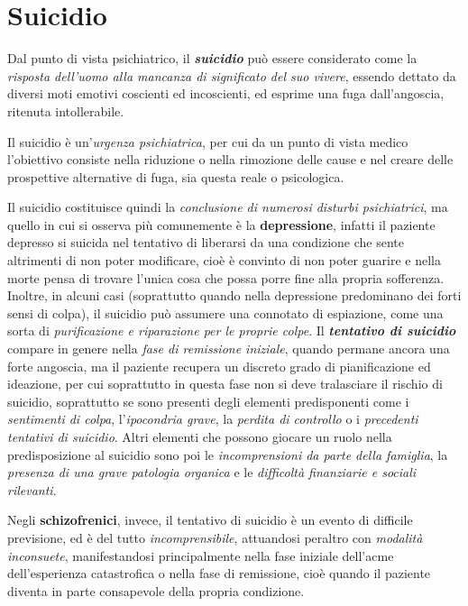 \section{Suicidio}

Dal punto di vista psichiatrico, il \textbf{\emph{suicidio}} può essere
considerato come la \emph{risposta dell'uomo alla mancanza di
significato del suo vivere}, essendo dettato da diversi moti emotivi
coscienti ed incoscienti, ed esprime una fuga dall'angoscia, ritenuta
intollerabile.

Il suicidio è un'\emph{urgenza psichiatrica}, per cui da un punto di
vista medico l'obiettivo consiste nella riduzione o nella rimozione
delle cause e nel creare delle prospettive alternative di fuga, sia
questa reale o psicologica.

Il suicidio costituisce quindi la \emph{conclusione di numerosi disturbi
psichiatrici}, ma quello in cui si osserva più comunemente è la
\textbf{depressione}, infatti il paziente depresso si suicida nel
tentativo di liberarsi da una condizione che sente altrimenti di non
poter modificare, cioè è convinto di non poter guarire e nella morte
pensa di trovare l'unica cosa che possa porre fine alla propria
sofferenza. Inoltre, in alcuni casi (soprattutto quando nella
depressione predominano dei forti sensi di colpa), il suicidio può
assumere una connotato di espiazione, come una sorta di
\emph{purificazione e riparazione per le proprie colpe}. Il
\textbf{\emph{tentativo di suicidio}} compare in genere nella \emph{fase
di remissione iniziale}, quando permane ancora una forte angoscia, ma il
paziente recupera un discreto grado di pianificazione ed ideazione, per
cui soprattutto in questa fase non si deve tralasciare il rischio di
suicidio, soprattutto se sono presenti degli elementi predisponenti come
i \emph{sentimenti di colpa}, l'\emph{ipocondria grave}, la
\emph{perdita di controllo} o i \emph{precedenti tentativi di suicidio}.
Altri elementi che possono giocare un ruolo nella predisposizione al
suicidio sono poi le \emph{incomprensioni da parte della famiglia}, la
\emph{presenza di una grave patologia organica} e le \emph{difficoltà
finanziarie e sociali rilevanti}.

Negli \textbf{schizofrenici}, invece, il tentativo di suicidio è un
evento di difficile previsione, ed è del tutto \emph{incomprensibile},
attuandosi peraltro con \emph{modalità inconsuete}, manifestandosi
principalmente nella fase iniziale dell'acme dell'esperienza
catastrofica o nella fase di remissione, cioè quando il paziente diventa
in parte consapevole della propria condizione.

